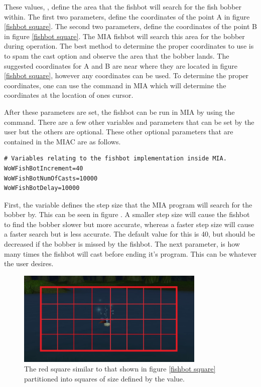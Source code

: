 These values, , define the area that the fishbot will search for the fish bobber within. The first two parameters,  define the coordinates of the point A in figure \ref{fishbot square}. The second two parameters,  define the coordinates of the point B in figure \ref{fishbot square}. The MIA fishbot will search this area for the bobber during operation. The best method to determine the proper coordinates to use is to spam the cast option and observe the area that the bobber lands. The suggested coordinates for A and B are near where they are located in figure \ref{fishbot square}, however any coordinates can be used. To determine the proper coordinates, one can use the  command in MIA which will determine the coordinates at the location of ones cursor.

After these parameters are set, the fishbot can be run in MIA by using the  command. There are a few other variables and parameters that can be set by the user but the others are optional. These other optional parameters that are contained in the MIAC are as follows.

\begin{lstlisting}
# Variables relating to the fishbot implementation inside MIA.
WoWFishBotIncrement=40
WoWFishBotNumOfCasts=10000
WoWFishBotDelay=10000
\end{lstlisting}

First, the  variable defines the step size that the MIA program will search for the bobber by. This can be seen in figure \label{fishbot increments}. A smaller step size will cause the fishbot to find the bobber slower but more accurate, whereas a faster step size will cause a faster search but is less accurate. The default value for this is 40, but should be decreased if the bobber is missed by the fishbot. The next parameter,  is how many times the fishbot will cast before ending it's program. This can be whatever the user desires. 



\begin{figure}[h]
	\centering
	\includegraphics[width=0.8\textwidth]{images/WoWScrnShot_040118_234227b.jpg}
	\caption{The red square similar to that shown in figure \ref{fishbot square} partitioned into squares of size defined by the  value.} \label{fishbot increments}
\end{figure}

